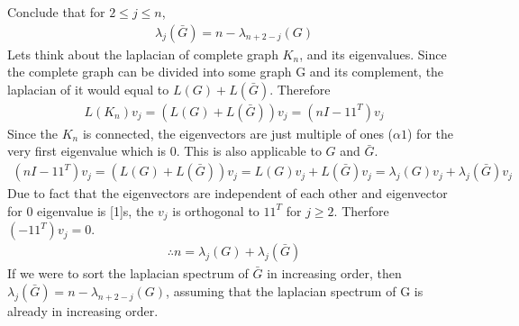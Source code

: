 \documentclass{article}
\begin{document}
\begin{problem}
    Conclude that for $2 \leq j \leq n$,
    \begin{align*}
        \lambda_j (\bar{G}) = n - \lambda_{n+2-j}(G)
    \end{align*}
    Lets think about the laplacian of complete graph $K_n$, and its eigenvalues. Since the complete graph can be divided into some graph G and its complement, the laplacian of it would equal to $L(G) + L(\bar{G})$. Therefore 
    \begin{align*}
        L(K_n) v_j = (L(G) + L(\bar{G})) v_j = (nI -11^T) v_j
    \end{align*}
    Since the $K_n$ is connected, the eigenvectors are just multiple of ones ($\alpha 1$) for the very first eigenvalue which is 0. This is also applicable to $G$ and $\bar{G}$.
    \begin{align*}
        (nI -11^T) v_j = (L(G) + L(\bar{G})) v_j = L(G) v_j + L(\bar{G}) v_j = \lambda_j(G) v_j + \lambda_j(\bar{G})v_j 
    \end{align*}
    Due to fact that the eigenvectors are independent of each other and eigenvector for 0 eigenvalue is [1]s, the $v_j$ is orthogonal to $11^T$ for $j \geq 2$. Therfore $(-11^T) v_j = 0$. 
    \begin{align*}
        \therefore n = \lambda_j(G) + \lambda_j(\bar{G})
    \end{align*}
    If we were to sort the laplacian spectrum of $\bar{G}$ in increasing order, then $ \lambda_j(\bar{G}) = n - \lambda_{n + 2 - j}(G)$, assuming that the laplacian spectrum of G is already in increasing order. 
\end{problem}
\end{document}
